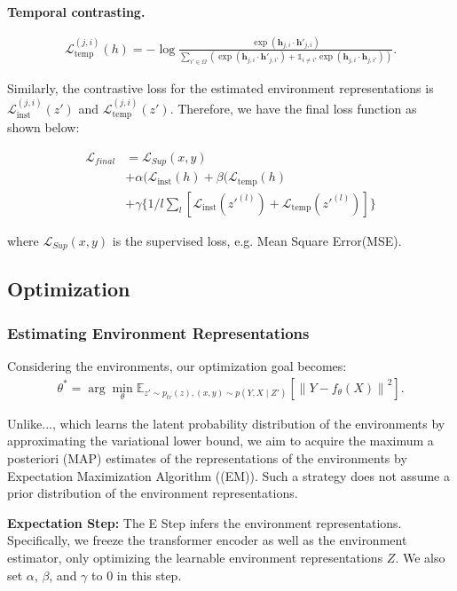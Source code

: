 \textbf{Temporal contrasting.}

{\tiny
\begin{align}
\mathcal{L}_{\text{temp}}^{(j, i)}(h) =-\log \frac{\exp \left( \mathbf{h}_{j,i} \cdot \mathbf{h}'_{j,i} \right)}{\sum_{i' \in \Omega} \left( \exp \left( \mathbf{h}_{j,i} \cdot \mathbf{h}'_{j,i'} \right) + \mathbb{1}_{i \neq i'} \exp \left( \mathbf{h}_{j,i} \cdot \mathbf{h}_{j,i'} \right) \right)}. \tag{6}
\end{align}
}

Similarly, the contrastive loss for the estimated environment representations is $\mathcal{L}_{\text{inst}}^{(j, i)}(z')$ and $\mathcal{L}_{\text{temp}}^{(j, i)}(z')$. Therefore, we have the final loss function as shown below:

{\small
\begin{align}
\mathcal{L}_{final} &= \mathcal{L}_{Sup}(x, y)  \nonumber \\
&+ \alpha (\mathcal{L}_{\text{inst}}(h) +\beta (\mathcal{L}_{\text{temp}}(h) \nonumber \\
&+ \gamma \{ 1/l \sum_l [\mathcal{L}_{\text{inst}}(z'^{(l)}) + \mathcal{L}_{\text{temp}}(z'^{(l)})] \} \tag{7}
\end{align}
}

where $\mathcal{L}_{Sup}(x, y)$ is the supervised loss, e.g. Mean Square Error(MSE).


\subsection{Optimization}
\subsubsection{Estimating Environment Representations}
Considering the environments, our optimization goal becomes:
{\small
\begin{align}
\theta^* = \arg\min_\theta \mathbb{E}_{z' \sim p_{tr}(z), (x, y) \sim p(Y, X \mid Z')} \left[ \left\| Y - f_\theta(X) \right\|^2 \right].
\end{align}
}

Unlike..., which learns the latent probability distribution of the environments by approximating the variational lower bound, we aim to acquire the maximum a posteriori (MAP) estimates of the representations of the environments by Expectation Maximization Algorithm ((EM)). Such a strategy does not assume a prior distribution of the environment representations.

\textbf{Expectation Step:} The E Step infers the environment representations. Specifically, we freeze the transformer encoder as well as the environment estimator, only optimizing the learnable environment representations $Z$. We also set $\alpha$, $\beta$, and $\gamma$ to 0 in this step. 

